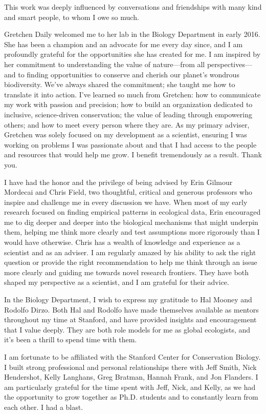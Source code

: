 
This work was deeply influenced by conversations and friendships with many kind and smart people, to whom I owe so much.

Gretchen Daily welcomed me to her lab in the Biology Department in early 2016. She has been a champion and an advocate for me every day since, and I am profoundly grateful for the opportunities she has created for me. I am inspired by her commitment to understanding the value of nature—from all perspectives—and to finding opportunities to conserve and cherish our planet's wondrous biodiversity. We've always shared the commitment; she taught me how to translate it into action. I've learned so much from Gretchen: how to communicate my work with passion and precision; how to build an organization dedicated to inclusive, science-driven conservation; the value of leading through empowering others; and how to meet every person where they are. As my primary adviser, Gretchen was solely focused on my development as a scientist, ensuring I was working on problems I was passionate about and that I had access to the people and resources that would help me grow. I benefit tremendously as a result. Thank you.

I have had the honor and the privilege of being advised by Erin Gilmour Mordecai and Chris Field, two thoughtful, critical and generous professors who inspire and challenge me in every discussion we have. When most of my early research focused on finding empirical patterns in ecological data, Erin encouraged me to dig deeper and deeper into the biological mechanisms that might underpin them, helping me think more clearly and test assumptions more rigorously than I would have otherwise. Chris has a wealth of knowledge and experience as a scientist and as an adviser. I am regularly amazed by his ability to ask the right question or provide the right recommendation to help me think through an issue more clearly and guiding me towards novel research frontiers. They have both shaped my perspective as a scientist, and I am grateful for their advice.

In the Biology Department, I wish to express my gratitude to Hal Mooney and Rodolfo Dirzo. Both Hal and Rodolfo have made themselves available as mentors throughout my time at Stanford, and have provided insights and encouragement that I value deeply. They are both role models for me as global ecologists, and it's been a thrill to spend time with them.

I am fortunate to be affiliated with the Stanford Center for Conservation Biology. I built strong professional and personal relationships there with Jeff Smith, Nick Hendershot, Kelly Langhans, Greg Bratman, Hannah Frank, and Jon Flanders. I am particularly grateful for the time spent with Jeff, Nick, and Kelly, as we had the opportunity to grow together as Ph.D. students and to constantly learn from each other. I had a blast.


